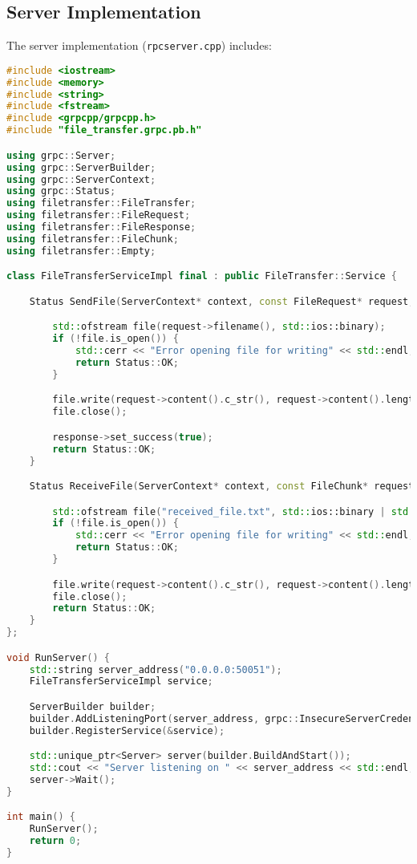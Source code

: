 \documentclass{article}
\begin{document}
\subsection{Server Implementation}
The server implementation (\texttt{rpcserver.cpp}) includes:
\begin{lstlisting}[language=C++, caption=Server Implementation]
#include <iostream>
#include <memory>
#include <string>
#include <fstream>
#include <grpcpp/grpcpp.h>
#include "file_transfer.grpc.pb.h"

using grpc::Server;
using grpc::ServerBuilder;
using grpc::ServerContext;
using grpc::Status;
using filetransfer::FileTransfer;
using filetransfer::FileRequest;
using filetransfer::FileResponse;
using filetransfer::FileChunk;
using filetransfer::Empty;

class FileTransferServiceImpl final : public FileTransfer::Service {

    Status SendFile(ServerContext* context, const FileRequest* request, FileResponse* response) override {

        std::ofstream file(request->filename(), std::ios::binary);
        if (!file.is_open()) {
            std::cerr << "Error opening file for writing" << std::endl;
            return Status::OK;
        }

        file.write(request->content().c_str(), request->content().length());
        file.close();

        response->set_success(true);
        return Status::OK;
    }

    Status ReceiveFile(ServerContext* context, const FileChunk* request, Empty* response) override {

        std::ofstream file("received_file.txt", std::ios::binary | std::ios::app);
        if (!file.is_open()) {
            std::cerr << "Error opening file for writing" << std::endl;
            return Status::OK;
        }

        file.write(request->content().c_str(), request->content().length());
        file.close();
        return Status::OK;
    }
};

void RunServer() {
    std::string server_address("0.0.0.0:50051");
    FileTransferServiceImpl service;

    ServerBuilder builder;
    builder.AddListeningPort(server_address, grpc::InsecureServerCredentials());
    builder.RegisterService(&service);

    std::unique_ptr<Server> server(builder.BuildAndStart());
    std::cout << "Server listening on " << server_address << std::endl;
    server->Wait();
}

int main() {
    RunServer();
    return 0;
}
\end{lstlisting}
\end{document}
